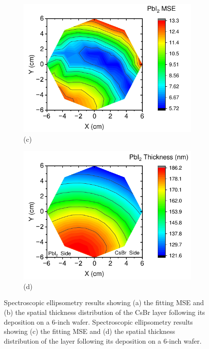 \begin{figure}[ht!]
    \begin{subfigure}[t]{0.49\textwidth}
        \centering
        \includegraphics[width=\textwidth]{chapters/stability/imeges/PbI2MSE.pdf} %
        \caption*{(c)}
    \end{subfigure}
    \hfill
    \begin{subfigure}[t]{0.49\textwidth}
        \centering
        \includegraphics[width=\textwidth]{chapters/stability/imeges/PbI2Thickness.pdf} %
        \caption*{(d)}
    \end{subfigure}
    \caption{Spectroscopic ellipsometry results showing (a) the fitting MSE and (b) the spatial thickness distribution of the CsBr layer following its deposition on a 6-inch wafer. Spectroscopic ellipsometry results showing (c) the fitting MSE and (d) the spatial thickness distribution of the  layer following its deposition on a 6-inch wafer.}
    \label{fig:stability:ellipsometry:thickness_mse}
\end{figure}

